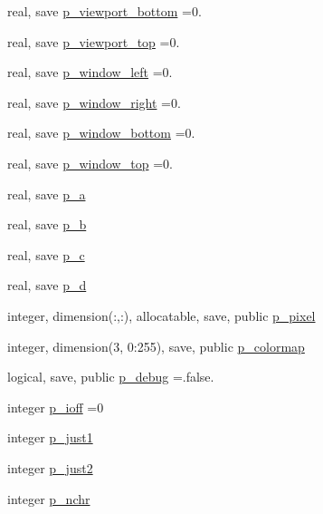 \begin{DoxyCompactItemize}
real, save \mbox{\hyperlink{namespacem__pixel_a1bcd9c34bcf4869912b4267964b5e92d}{p\+\_\+viewport\+\_\+bottom}} =0.
\item 
real, save \mbox{\hyperlink{namespacem__pixel_a127bd1570b649951e9f064c65e71945c}{p\+\_\+viewport\+\_\+top}} =0.
\item 
real, save \mbox{\hyperlink{namespacem__pixel_a03d347205feb2f06305a014717de8b26}{p\+\_\+window\+\_\+left}} =0.
\item 
real, save \mbox{\hyperlink{namespacem__pixel_a213461921eae5a7ec6d2eb399cf849da}{p\+\_\+window\+\_\+right}} =0.
\item 
real, save \mbox{\hyperlink{namespacem__pixel_a5956f9820f460143df9022d9eb7f833d}{p\+\_\+window\+\_\+bottom}} =0.
\item 
real, save \mbox{\hyperlink{namespacem__pixel_ab8c6c7f81ee857e70e77b08de015d416}{p\+\_\+window\+\_\+top}} =0.
\item 
real, save \mbox{\hyperlink{namespacem__pixel_a67dc9122cf985392ef839d0e01bdd175}{p\+\_\+a}}
\item 
real, save \mbox{\hyperlink{namespacem__pixel_a54a88e65093f2eebae449b44eb9188ed}{p\+\_\+b}}
\item 
real, save \mbox{\hyperlink{namespacem__pixel_a4f7e47e7c8108aea8b5e41bc4cde3cf4}{p\+\_\+c}}
\item 
real, save \mbox{\hyperlink{namespacem__pixel_aedcfb264a04a70d3dba9dc7c347bdf37}{p\+\_\+d}}
\item 
integer, dimension(\+:,\+:), allocatable, save, public \mbox{\hyperlink{namespacem__pixel_abdde5773f7569de72bb28d6818a44914}{p\+\_\+pixel}}
\item 
integer, dimension(3, 0\+:255), save, public \mbox{\hyperlink{namespacem__pixel_aa6b9c445365db696d6a7a9a794ceba43}{p\+\_\+colormap}}
\item 
logical, save, public \mbox{\hyperlink{namespacem__pixel_aa98d89b6e06aa65bb897ee27901ab8ce}{p\+\_\+debug}} =.false.
\item 
integer \mbox{\hyperlink{namespacem__pixel_a7dfccfa543f53e4f6bd06a28f963ee69}{p\+\_\+ioff}} =0
\item 
integer \mbox{\hyperlink{namespacem__pixel_aea6d1d5a4f88e0b07db43e92463bb065}{p\+\_\+just1}}
\item 
integer \mbox{\hyperlink{namespacem__pixel_a9d00991f1ff7ed891170100d8e9d64f0}{p\+\_\+just2}}
\item 
integer \mbox{\hyperlink{namespacem__pixel_a70edd7b43b9667a9d304b3028f113cc8}{p\+\_\+nchr}}
\item 

\end{DoxyCompactItemize}
